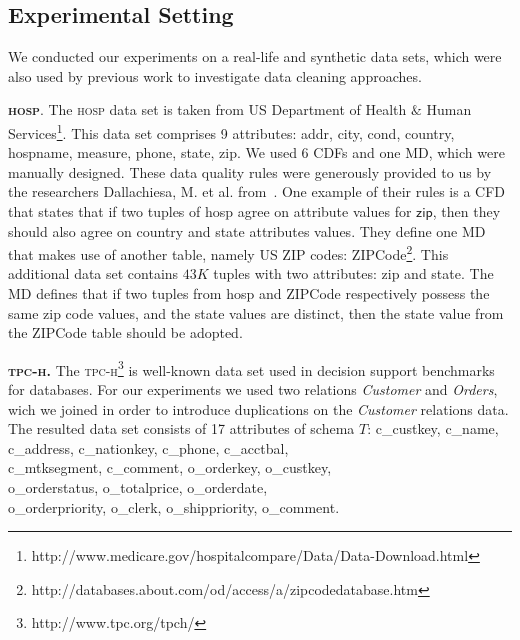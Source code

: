 \subsection{Experimental Setting} 
We conducted our experiments on a real-life and synthetic data sets, which were also used by previous work to investigate data cleaning approaches.

\textbf{\textsc{hosp}}. The \textsc{hosp} data set is taken from US Department of Health $\&$ Human Services\footnote{http://www.medicare.gov/hospitalcompare/Data/Data-Download.html}. This data set comprises 9 attributes: \textsf{addr}, \textsf{city}, \textsf{cond}, \textsf{country}, \textsf{hospname}, \textsf{measure}, \textsf{phone}, \textsf{state}, \textsf{zip}. 
We used 6 CDFs and one MD, which were manually designed. These data quality rules were generously provided to us by the researchers Dallachiesa, M. et al. from~\cite{Dallachiesa:2013:NCD:2463676.2465327}. One example of their rules is a CFD that states that if two tuples of \textsf{hosp} agree on attribute values for $\textsf{zip}$, then they should also agree on \textsf{country} and \textsf{state} attributes values. They define one MD that makes use of another table, namely US ZIP codes: ZIPCode\footnote{http://databases.about.com/od/access/a/zipcodedatabase.htm}. This additional data set contains $43K$ tuples with two attributes: \textsf{zip} and \textsf{state}. The MD defines that if two tuples from \textsf{hosp} and ZIPCode respectively possess the same zip code values, and the state values are distinct, then the state value from the ZIPCode table should be adopted. 

\textbf{\textsc{tpc-h}.} The \textsc{tpc-h}\footnote{http://www.tpc.org/tpch/} is well-known data set used in decision support benchmarks for databases. For our experiments we used two relations \textit{Customer} and \textit{Orders}, wich we joined in order to introduce duplications on the \textit{Customer} relations data. The resulted data set consists of 17 attributes of schema $T$: \textsf{c\_custkey}, \textsf{c\_name}, \textsf{c\_address},  \textsf{c\_nationkey}, \textsf{c\_phone}, \textsf{c\_acctbal},\\ \textsf{c\_mtksegment}, \textsf{c\_comment}, \textsf{o\_orderkey}, \textsf{o\_custkey},\\ \textsf{o\_orderstatus}, \textsf{o\_totalprice}, \textsf{o\_orderdate},\\ \textsf{o\_orderpriority}, \textsf{o\_clerk}, \textsf{o\_shippriority}, \textsf{o\_comment}.  

